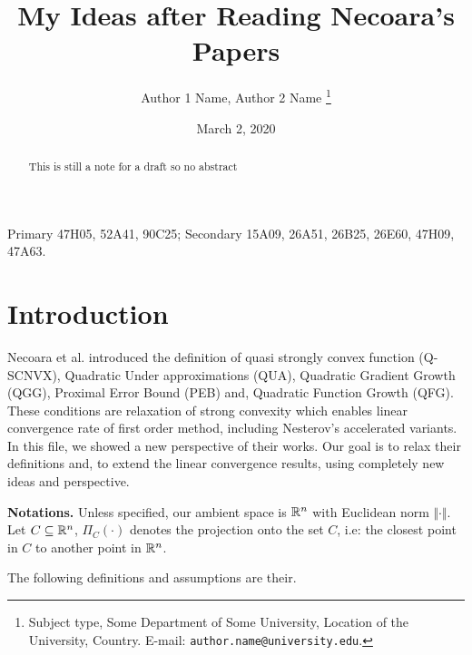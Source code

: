 \documentclass[12pt]{article}
\begin{document}
\newcommand{\dist}{\ensuremath{\operatorname{dist}}}

\title{{\selectfont My Ideas after Reading Necoara's Papers}}

\author{
    Author 1 Name, Author 2 Name
    \thanks{
        Subject type, Some Department of Some University, Location of the University,
        Country. E-mail: \texttt{author.name@university.edu}.
    }
}

\date{March 2, 2020}

\maketitle
{}

\begin{abstract} 
    \noindent
    This is still a note for a draft so no abstract \cite{bauschke_convex_2017}
\end{abstract}

Primary 47H05, 52A41, 90C25; Secondary 15A09, 26A51, 26B25, 26E60, 47H09, 47A63.


\section{Introduction}
    Necoara et al. \cite{necoara_linear_2019}  introduced the definition of quasi strongly convex function (Q-SCNVX), Quadratic Under approximations (QUA), Quadratic Gradient Growth (QGG), Proximal Error Bound (PEB) and, Quadratic Function Growth (QFG). 
    These conditions are relaxation of strong convexity which enables linear convergence rate of first order method, including Nesterov's accelerated variants. 
    In this file, we showed a new perspective of their works. 
    Our goal is to relax their definitions and, to extend the linear convergence results, using completely new ideas and perspective. 
    \par
    \textbf{Notations.}
    Unless specified, our ambient space is $\mathbb R^n$ with Euclidean norm $\Vert \cdot\Vert$.
    Let $C\subseteq \mathbb R^n$, $\Pi_C(\cdot)$ denotes the projection onto the set $C$, i.e: the closest point in $C$ to another point in $\mathbb R^n$. 
    \par
    The following definitions and assumptions are their. 
    
\end{document}
